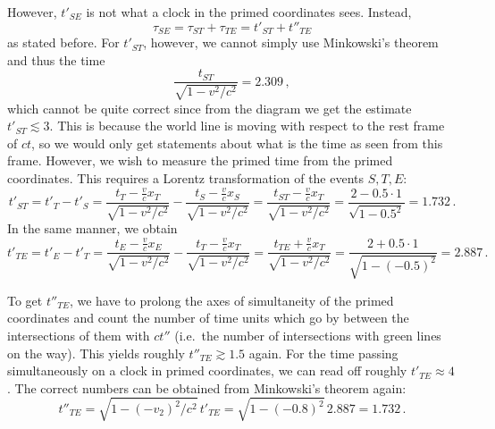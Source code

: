 \documentclass[../relativity_main.tex]{subfiles}
\begin{document}
\begin{ex}
\begin{itemize}
	
		However, $t'_{SE}$ is not what a clock in the primed coordinates sees. Instead, 
		\begin{equation*}
			\tau_{SE} = \tau_{ST} + \tau_{TE} = t'_{ST} + t''_{TE}
		\end{equation*}
		as stated before. For $t'_{ST}$, however, we cannot simply use Minkowski's theorem and thus the time
		\begin{equation*}
			\frac{t_{ST}}{\sqrt{1 - v^2 / c^2}} = 2.309 \, ,
		\end{equation*}
		which cannot be quite correct since from the diagram we get the estimate $t'_{ST} \lesssim 3$. This is because the world line is moving with respect to the rest frame of $ct$, so we would only get statements about what is the time as seen from this frame. However, we wish to measure the primed time from the primed coordinates. This requires a Lorentz transformation of the events $S, T, E$:
		\begin{equation*}
			t'_{ST} = t'_T - t'_S = \frac{t_T - \frac{v}{c} x_T}{\sqrt{1 - v^2 / c^2}} - \frac{t_S - \frac{v}{c} x_S}{\sqrt{1 - v^2 / c^2}} = \frac{t_{ST} - \frac{v}{c} x_T}{\sqrt{1 - v^2 / c^2}} = \frac{2 - 0.5 \cdot 1}{\sqrt{1 - 0.5^2}} = 1.732 \, .
		\end{equation*}
		In the same manner, we obtain
		\begin{equation*}
			t'_{TE} = t'_E - t'_T = \frac{t_E - \frac{v}{c} x_E}{\sqrt{1 - v^2 / c^2}} - \frac{t_T - \frac{v}{c} x_T}{\sqrt{1 - v^2 / c^2}} = \frac{t_{TE} + \frac{v}{c} x_T}{\sqrt{1 - v^2 / c^2}} = \frac{2 + 0.5 \cdot 1}{\sqrt{1 - (-0.5)^2}} = 2.887 \, .
		\end{equation*}
	
		To get $t''_{TE}$, we have to prolong the axes of simultaneity of the primed coordinates and count the number of time units which go by between the intersections of them with $ct''$ (i.e.~the number of intersections with green lines on the way). This yields roughly $t''_{TE} \gtrsim 1.5$ again. For the time passing simultaneously on a clock in primed coordinates, we can read off roughly $t'_{TE} \approx 4$. The correct numbers can be obtained from Minkowski's theorem again:
		\begin{equation*}
			t''_{TE} = \sqrt{1 - (-v_2)^2 / c^2} \, t'_{TE} = \sqrt{1 - (-0.8)^2} \, 2.887 = 1.732 \, .
		\end{equation*}
	

\end{itemize}
\end{ex}
\end{document}
